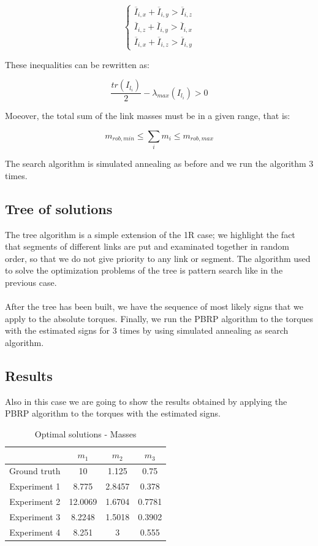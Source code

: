 \documentclass{article}
\begin{document}
\[\begin{cases}
\overline{I}_{i,x}+\overline{I}_{i,y} > \overline{I}_{i,z} \\
\overline{I}_{i,z}+\overline{I}_{i,y} > \overline{I}_{i,x} \\
\overline{I}_{i,x}+\overline{I}_{i,z} > \overline{I}_{i,y}
\end{cases}\]

These inequalities can be rewritten as:

\[\frac{tr(I_{l_i})}{2}-\lambda_{max}(I_{l_i})>0\]

Moeover, the total sum of the link masses must be in a given range, that is:

\[m_{rob,min}\le \sum_i{m_i} \le m_{rob,max}\]

The search algorithm is simulated annealing as before and we run the algorithm 3 times.
\subsection{Tree of solutions}
The tree algorithm is a simple extension of the 1R case; we highlight the fact that segments of different links are put and examinated together in random order, so that we do not give priority to any link or segment. The algorithm used to solve the optimization problems of the tree is pattern search like in the previous case.
\\\\
After the tree has been built, we have the sequence of most likely signs that we apply to the absolute torques. Finally, we run the PBRP algorithm to the torques with the estimated signs for 3 times by using simulated annealing as search algorithm.

\subsection{Results} Also in this case we are going to show the results obtained by applying the PBRP algorithm to the torques with the estimated signs.

\begin{table}[!htbp]
\centering
\begin{tabular}{|c|ccc|}
\hline
 & $m_1$ & $m_2$ & $m_3$\\
\hline
Ground truth & 10 & 1.125 & 0.75 \\
Experiment 1 & 8.775 & 2.8457 & 0.378\\
Experiment 2 & 12.0069 & 1.6704 & 0.7781\\
Experiment 3 & 8.2248 & 1.5018 & 0.3902\\
Experiment 4 & 8.251 & 3 & 0.555\\
\hline
\end{tabular}
\caption{Optimal solutions - Masses}
\end{table}
\end{document}
